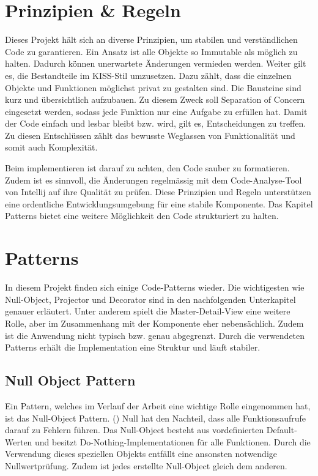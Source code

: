 \section{Prinzipien \& Regeln}

Dieses Projekt hält sich an diverse Prinzipien, um stabilen und verständlichen Code zu garantieren.
Ein Ansatz ist alle Objekte so Immutable als möglich zu halten.
Dadurch können unerwartete Änderungen vermieden werden.
Weiter gilt es, die Bestandteile im KISS-Stil umzusetzen.
Dazu zählt, dass die einzelnen Objekte und Funktionen möglichst privat zu gestalten sind.
Die Bausteine sind kurz und übersichtlich aufzubauen.
Zu diesem Zweck soll Separation of Concern eingesetzt werden, sodass jede Funktion nur eine Aufgabe zu erfüllen hat.
Damit der Code einfach und lesbar bleibt bzw. wird, gilt es, Entscheidungen zu treffen.
Zu diesen Entschlüssen zählt das bewusste Weglassen von Funktionalität und somit auch Komplexität.

Beim implementieren ist darauf zu achten, den Code sauber zu formatieren.
Zudem ist es sinnvoll, die Änderungen regelmässig mit dem Code-Analyse-Tool von Intellij auf ihre Qualität zu prüfen. 
Diese Prinzipien und Regeln unterstützen eine ordentliche Entwicklungsumgebung für eine stabile Komponente.
Das Kapitel Patterns bietet eine weitere Möglichkeit den Code strukturiert zu halten.


\section{Patterns}

In diesem Projekt finden sich einige Code-Patterns wieder.
Die wichtigesten wie Null-Object, Projector und Decorator sind in den nachfolgenden Unterkapitel genauer erläutert.
Unter anderem spielt die Master-Detail-View eine weitere Rolle, aber im Zusammenhang mit der Komponente eher nebensächlich.
Zudem ist die Anwendung nicht typisch bzw. genau abgegrenzt.
Durch die verwendeten Patterns erhält die Implementation eine Struktur und läuft stabiler.


\subsection{Null Object Pattern}

Ein Pattern, welches im Verlauf der Arbeit eine wichtige Rolle eingenommen hat, ist das Null-Object Pattern.
(\cite{nullObjectPattern}) Null hat den Nachteil, dass alle Funktionsaufrufe darauf zu Fehlern führen.
Das Null-Object besteht aus vordefinierten Default-Werten und besitzt Do-Nothing-Implementationen für alle Funktionen.
Durch die Verwendung dieses speziellen Objekts entfällt eine ansonsten notwendige Nullwertprüfung.
Zudem ist jedes erstellte Null-Object gleich dem anderen.

